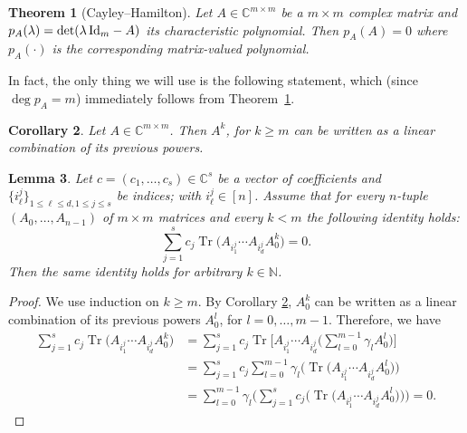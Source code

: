 \documentclass[pdftex]{sigma}
\numberwithin{equation}{section}
\newtheorem{Theorem}{Theorem}[section]
\newtheorem{Corollary}[Theorem]{Corollary}
\newtheorem{Lemma}[Theorem]{Lemma}
\DeclareMathOperator{\Tr}{Tr}
\newcommand{\CC}{\mathbb{C}}
\begin{document}
\begin{Theorem}[Cayley--Hamilton]\label{theorem: CH}
Let $A\in {\mathbb C}^{m\times m}$ be a $m\times m$ complex matrix and $p_A(\lambda)=\det(\lambda \,{\rm Id}_m -A)$ its characteristic polynomial. Then $p_A(A)=0$ where $p_A(\cdot)$ is the corresponding matrix-valued polynomial.
\end{Theorem}
In fact, the only thing we will use is the following statement, which (since $\deg p_A = m$) immediately follows from Theorem~\ref{theorem: CH}.
\begin{Corollary}\label{cor: CH}
	Let $A\in {\mathbb C}^{m\times m}$. Then $A^k$, for $k\geq m$ can be written as a linear combination of its previous powers.
\end{Corollary}
\begin{Lemma}\label{lemma: CH}
    Let $c = (c_1,\dots,c_s) \in \CC^s$ be a vector of coefficients and $\big\{i_\ell^{j}\big\}_{1\leq\ell\leq d, 1 \leq j \leq s}$ be indices; with $i_\ell^{j} \in [n]$.
    Assume that for every $n$-tuple $(A_0,\dots,A_{n-1})$ of $m \times m$ matrices and every $k < m$ the following identity holds:
    \begin{equation} \label{eq:lemCH}
        \sum_{j=1}^s c_j \Tr\big(A_{i_1^j} \cdots A_{i_d^j}A_0^k\big)=0.
    \end{equation}
	Then the same identity holds for arbitrary $k \in {\mathbb N}$.
\end{Lemma}
\begin{proof}
	We use induction on $k \geq m$. By Corollary \ref{cor: CH}, $A_0^k$ can be written as a linear combination of its previous powers $A_0^l$, for $l=0,\dots,m-1$. Therefore, we have
	\begin{align*}
	    \sum_{j=1}^{s}c_j \Tr\big(A_{i_1^j}\cdots A_{i_d^j} A_{0}^k\big)
	    & = \sum_{j=1}^{s}c_j \Tr\bigg[A_{i_1^j}\cdots A_{i_d^j} \bigg(\sum_{l=0}^{m-1}\gamma_l A_0^l\bigg)\bigg]\\
	    & = \sum_{j=1}^s c_j\sum_{l=0}^{m-1} \gamma_l \big(\Tr\big(A_{i_1^j}\cdots A_{i_d^j} A_{0}^l\big)\big)\\
	    & = \sum_{l=0}^{m-1} \gamma_l \bigg(\sum_{j=1}^s c_j \big(\Tr\big(A_{i_1^j}\cdots A_{i_d^j} A_{0}^l\big)\big)\bigg)=0.\tag*{\qed}
	\end{align*}\renewcommand{\qed}{}
\end{proof}
\end{document}
